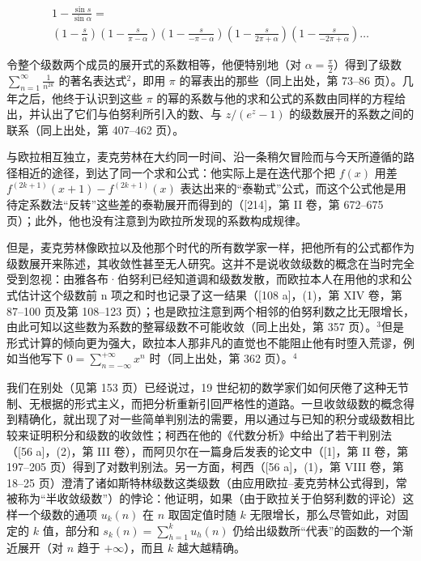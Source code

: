 \[
\begin{array}{c} 1 - \frac {\sin s}{\sin \alpha} = \\ \left(1 - \frac {s}{\alpha}\right) \left(1 - \frac {s}{\pi - \alpha}\right) \left(1 - \frac {s}{- \pi - \alpha}\right) \left(1 - \frac {s}{2 \pi + \alpha}\right) \left(1 - \frac {s}{- 2 \pi + \alpha}\right) \dots \end{array}
\]

令整个级数两个成员的展开式的系数相等，他便特别地（对 \(\alpha = \frac{\pi}{2}\)）得到了级数 \(\sum_{n=1}^{\infty} \frac{1}{n^{2k}}\) 的著名表达式\(^2\)，即用 \(\pi\) 的幂表出的那些（同上出处，第 73–86 页）。几年之后，他终于认识到这些 \(\pi\) 的幂的系数与他的求和公式的系数由同样的方程给出，并认出了它们与伯努利所引入的数、与 \(z/(e^z - 1)\) 的级数展开的系数之间的联系（同上出处，第 407–462 页）。

与欧拉相互独立，麦克劳林在大约同一时间、沿一条稍欠冒险而与今天所遵循的路径相近的途径，到达了同一个求和公式：他实际上是在迭代那个把 \(f(x)\) 用差 \(f^{(2k + 1)}(x + 1) - f^{(2k + 1)}(x)\) 表达出来的“泰勒式”公式，而这个公式他是用待定系数法“反转”这些差的泰勒展开而得到的（{[}214{]}，第 II 卷，第 672–675 页）；此外，他也没有注意到为欧拉所发现的系数构成规律。

但是，麦克劳林像欧拉以及他那个时代的所有数学家一样，把他所有的公式都作为级数展开来陈述，其收敛性甚至无人研究。这并不是说收敛级数的概念在当时完全受到忽视：由雅各布·伯努利已经知道调和级数发散，而欧拉本人在用他的求和公式估计这个级数前 n 项之和时也记录了这一结果（{[}108 a{]}，(1)，第 XIV 卷，第 87–100 页及第 108–123 页）；也是欧拉注意到两个相邻的伯努利数之比无限增长，由此可知以这些数为系数的整幂级数不可能收敛（同上出处，第 357 页）。\(^{3}\)但是形式计算的倾向更为强大，欧拉本人那非凡的直觉也不能阻止他有时堕入荒谬，例如当他写下 \(0 = \sum_{n=-\infty}^{+\infty} x^{n}\) 时（同上出处，第 362 页）。\(^{4}\)

我们在别处（见第 153 页）已经说过，19 世纪初的数学家们如何厌倦了这种无节制、无根据的形式主义，而把分析重新引回严格性的道路。一旦收敛级数的概念得到精确化，就出现了对一些简单判别法的需要，用以通过与已知的积分或级数相比较来证明积分和级数的收敛性；柯西在他的《代数分析》中给出了若干判别法（{[}56 a{]}，(2)，第 III 卷），而阿贝尔在一篇身后发表的论文中（{[}1{]}，第 II 卷，第 197–205 页）得到了对数判别法。另一方面，柯西（{[}56 a{]}，(1)，第 VIII 卷，第 18–25 页）澄清了诸如斯特林级数这类级数（由应用欧拉–麦克劳林公式得到，常被称为“半收敛级数”）的悖论：他证明，如果（由于欧拉关于伯努利数的评论）这样一个级数的通项 \(u_k(n)\) 在 \(n\) 取固定值时随 \(k\) 无限增长，那么尽管如此，对固定的 \(k\) 值，部分和 \(s_k(n) = \sum_{h=1}^{k} u_h(n)\) 仍给出级数所“代表”的函数的一个渐近展开（对 \(n\) 趋于 \(+\infty\)），而且 \(k\) 越大越精确。

